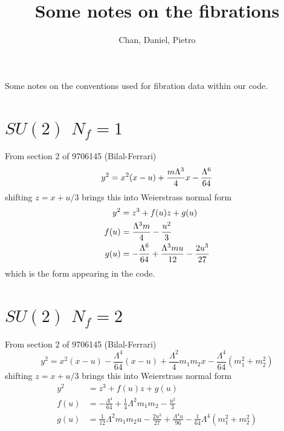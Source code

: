 \documentclass[11pt]{article}
\title{Some notes on the fibrations}
\author{Chan, Daniel, Pietro}
\newcommand{\be}{\begin{equation}}
\newcommand{\ee}{\end{equation}}
\begin{document}
\maketitle
\begin{center}
	Some notes on the conventions used for fibration data within our code.
\end{center}
\tableofcontents


\section{$SU(2)$ $N_{f}=1$}

From section 2 of 9706145 (Bilal-Ferrari)
\be
	y^{2} = x^{2}(x-u) + {m \Lambda^{3}\over 4} x - {\Lambda^{6}\over 64}
\ee
shifting $z = x + u/3$ brings this into Weierstrass normal form
\be
\begin{split}
	y^{2} & = z^{3} + f(u) z + g(u) \\
	f(u) & = {\Lambda ^3 m\over 4} - \frac{u^2}{3}\\
	g(u) & = -\frac{\Lambda ^6}{64}+\frac{ \Lambda ^3 m u}{12} -\frac{2 u^3}{27}
\end{split}
\ee
which is the form appearing in the code.

\begin{comment}
From section 10.2 of GMN2
\be
	\lambda^{2} = \left( {\Lambda^{2} \over z^{3}} + {3 u\over z^{2}} + {2 m \Lambda^{} \over z^{}} + \Lambda^{2} \right)\, dz^{2}
\ee
upon a proper ($z$-dependent) rescaling od $\Lambda$, we may identify the elliptic curve
\be
	y^{2} = 4z^{3} + {8m\over \Lambda}z^{2}+{12 u\over \Lambda^{2}} z + 4
\ee
shifting $z \to z - 2m / 3\Lambda$ brings this into Weierstrass normal form
\be
\begin{split}
	y^{2} & = 4z^{3} - g_{2}(u) z - g_{3}(u) \\
	g_{2}(u) & = {16 m^{2} \over 3\Lambda^{2}} - {12 u \over \Lambda^{2}} \\
	g_{3}(u) & = {8 m u \over \Lambda^{3}} - {64 m^{3} \over 27 \Lambda^{3}} 
\end{split}
\ee
which is the form appearing in the code.
\end{comment}




\section{$SU(2)$ $N_{f}=2$}

From section 2 of 9706145 (Bilal-Ferrari)
\be
	y^{2} = x^{2}(x-u) - \frac{\Lambda^{4}}{64}(x-u) + \frac{\Lambda^{2}}{4}m_{1}m_{2}x - \frac{\Lambda^{4}}{64}(m_{1}^{2}+m_{2}^{2})
\ee
shifting $z = x + u/3$ brings this into Weierstrass normal form
\be
\begin{split}
	y^{2} & = z^{3} + f(u) z + g(u) \\
	f(u) & = -\frac{\Lambda ^4}{64}+\frac{1}{4} \Lambda ^2 m_1 m_2-\frac{u^2}{3}\\
	g(u) & = \frac{1}{12} \Lambda ^2 m_1 m_2 u-\frac{2 u^3}{27}+\frac{\Lambda ^4 u}{96} -\frac{1}{64} \Lambda ^4 \left(m_1^2+m_2^2\right)
\end{split}
\ee
\end{document}
